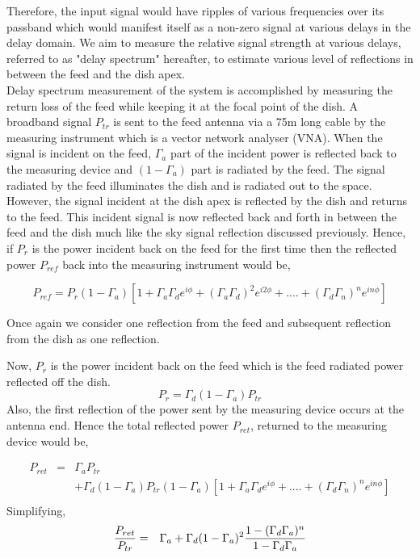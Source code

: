 \documentclass[12pt,preprint]{aastex}
\begin{document}
Therefore, the input signal would have ripples of various frequencies over its passband which would manifest itself as a non-zero signal at various delays in the delay domain. We aim to measure the relative signal strength at various delays, referred to as "delay spectrum" hereafter, to estimate various level of reflections in between the feed and the dish apex.\\
 
 Delay spectrum measurement of the system is accomplished by measuring the return loss of the feed while keeping it at the focal point of the dish. A broadband signal $P_{tr}$ is sent to the feed antenna via a 75m long cable by the measuring instrument which is a vector network analyser (VNA). When the signal is incident on the feed, $\Gamma_{a}$ part of the incident power is reflected back to the measuring device and $(1-\Gamma_{a})$ part is radiated by the feed. The signal radiated by the feed illuminates the dish and is radiated out to the space. However, the signal incident at the dish apex is reflected by the dish and returns to the feed. This incident signal is now reflected back and forth in between the feed and the dish much like the sky signal reflection discussed previously. Hence, if $P_{r}$ is the power incident back on the feed for the first time then the reflected power $P_{ref}$ back into the measuring instrument would be, 

\begin{equation}
P_{ref} =  P_{r}(1-\Gamma_{a}) [1+ \Gamma_{a}\Gamma_{d} e^{i\phi}+ (\Gamma_{a}\Gamma_{d})^2e^{i2\phi}+ ....+ (\Gamma_{d}\Gamma_{n})^{n}e^{in\phi}]
\end{equation}
 
Once again we consider one reflection from the feed and subsequent reflection from the dish as one reflection. 

Now, $P_{r}$ is the power incident back on the feed which is the feed radiated power reflected off the dish.  
\begin{equation}
P_{r}= \Gamma_{d}(1-\Gamma_a) P_{tr}
\end{equation}
Also, the first reflection of the power sent by the measuring device occurs at the antenna end. Hence the total reflected power $P_{ret}$, returned to the measuring device would be, 


\begin{eqnarray}
P_{ret} & = & \Gamma_{a}P_{tr} \nonumber\\ 
 & & +  \Gamma_{d}(1-\Gamma_a) P_{tr}(1-\Gamma_{a}) [1+ \Gamma_{a}\Gamma_{d} e^{i\phi}+  ....+ (\Gamma_{d}\Gamma_{n})^{n}e^{in\phi}]\nonumber\\
 \end{eqnarray}
 Simplifying, 
 \begin{eqnarray}
 {P_{ret} \over P_{tr} } & = & \Gamma_{a}
  +  \Gamma_{d}(1-\Gamma_a)^{2}  {1-(\Gamma_{d}\Gamma_{a})^{n} \over 1-\Gamma_{d} \Gamma_{a} } \nonumber\\
\end{eqnarray}
\end{document}
